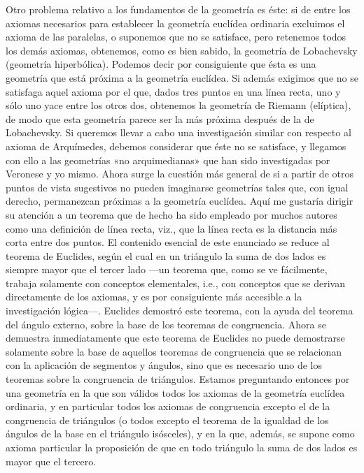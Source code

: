 \documentclass[a4paper, 12pt]{article}
\begin{document}
Otro problema relativo a los fundamentos de la geometría es éste: si de entre los axiomas necesarios para establecer la geometría euclídea ordinaria excluimos el axioma de las paralelas, o suponemos que no se satisface, pero retenemos todos los demás axiomas, obtenemos, como es bien sabido, la geometría de Lobachevsky (geometría hiperbólica). Podemos decir por consiguiente que ésta es una geometría que está próxima a la geometría euclídea. Si además exigimos que no se satisfaga aquel axioma por el que, dados tres puntos en una línea recta, uno y sólo uno yace entre los otros dos, obtenemos la geometría de Riemann (elíptica), de modo que esta geometría parece ser la más próxima después de la de Lobachevsky. Si queremos llevar a cabo una investigación similar con respecto al axioma de Arquímedes, debemos considerar que éste no se satisface, y llegamos con ello a las geometrías «no arquimedianas» que han sido investigadas por Veronese y yo mismo. Ahora surge la cuestión más general de si a partir de otros puntos de vista sugestivos no pueden imaginarse geometrías tales que, con igual derecho, permanezcan próximas a la geometría euclídea. Aquí me gustaría dirigir su atención a un teorema que de hecho ha sido empleado por muchos autores como una definición de línea recta, viz., que la línea recta es la distancia más corta entre dos puntos. El contenido esencial de este enunciado se reduce al teorema de Euclides, según el cual en un triángulo la suma de dos lados es siempre mayor que el tercer lado ---un teorema que, como se ve fácilmente, trabaja solamente con conceptos elementales, i.e., con conceptos que se derivan directamente de los axiomas, y es por consiguiente más accesible a la investigación lógica---. Euclides demostró este teorema, con la ayuda del teorema del ángulo externo, sobre la base de los teoremas de congruencia. Ahora se demuestra inmediatamente que este teorema de Euclides no puede demostrarse solamente sobre la base de aquellos teoremas de congruencia que se relacionan con la aplicación de segmentos y ángulos, sino que es necesario uno de los teoremas sobre la congruencia de triángulos. Estamos preguntando entonces por una geometría en la que son válidos todos los axiomas de la geometría euclídea ordinaria, y en particular todos los axiomas de congruencia excepto el de la congruencia de triángulos (o todos excepto el teorema de la igualdad de los ángulos de la base en el triángulo isósceles), y en la que, además, se supone como axioma particular la proposición de que en todo triángulo la suma de dos lados es mayor que el tercero.
\end{document}

